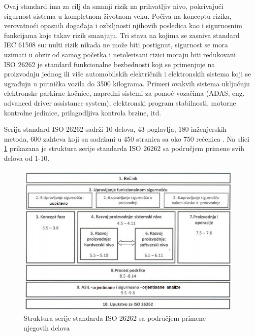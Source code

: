 \documentclass[a4paper]{article}
\begin{document}
Ovaj standard ima za cilj da smanji rizik na prihvatljiv nivo, pokrivajući sigurnost sistema u kompletnom životnom veku. Počiva na konceptu rizika, verovatnoći opasnih događaja i ozbiljnosti njihovih posledica kao i sigurnosnim funkcijama koje takav rizik smanjuju. Tri stava na kojima se zasniva standard IEC 61508 su: nulti rizik nikada ne može biti postignut, sigurnost se mora uzimati u obzir od samog početka i netolerisani rizici moraju biti redukovani \cite{ref36}. ISO 26262 je standard funkcionalne bezbednosti koji se primenjuje na proizvodnju jednog ili više automobilskih električnih i elektronskih sistema koji se ugrađuju u putnička vozila do 3500 kilograma.
Primeri ovakvih sistema uključuju elektronske parkirne kočnice, napredni sistemi za pomoć vozačima (ADAS, eng. advanced driver assistance system), elektronski program stabilnosti, motorne kontrolne jedinice, prilagodljiva kontrola brzine, itd. 
\bigbreak

Serija standard ISO 26262 sadrži 10 delova, 43 poglavlja, 180 inženjerskih metoda, 600 zahteva koji su sadržani u 450 stranica sa oko 750 rečenica \cite{ref36}. Na slici \ref{fig:primenastandarda} prikazana je struktura serije standarda ISO 26262 sa područjem primene svih delova od 1-10.
\bigbreak

\begin{figure}[h!]
\begin{center}
\includegraphics[scale=0.5]{primenastandarda.jpg}
\end{center}
\caption{Struktura serije standarda ISO 26262 sa područjem primene njegovih delova}
\label{fig:primenastandarda}
\end{figure}
\end{document}
